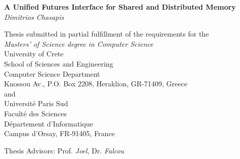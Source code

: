 \begin{titlepage}
\begin{center}

\LARGE \textbf{A Unified Futures Interface for Shared and Distributed Memory}\\[0.5cm]
\LARGE \textit{Dimitrios Chasapis}\\[0.5cm]

\vfill

\normalsize{
Thesis submitted in partial fulfillment of the requirements for the\\[0.30cm]

\textit{Masters' of Science degree in Computer Science}}\\[0.30cm]

University of Crete\\
School of Sciences and Engineering\\
Computer Science Department\\
Knossou Av., P.O. Box 2208, Heraklion, GR-71409, Greece\\[0.5cm]
and \\[0.5cm]
Université Paris Sud \\
Faculté des Sciences \\
Département d'Informatique \\
Campus d'Orsay, FR-91405, France \\

\vfill

\Large{Thesis Advisors: Prof. \emph{Joel}, Dr. \emph{Falcou}}\\[0.5cm]

\vfill

\end{center}

\end{titlepage}
